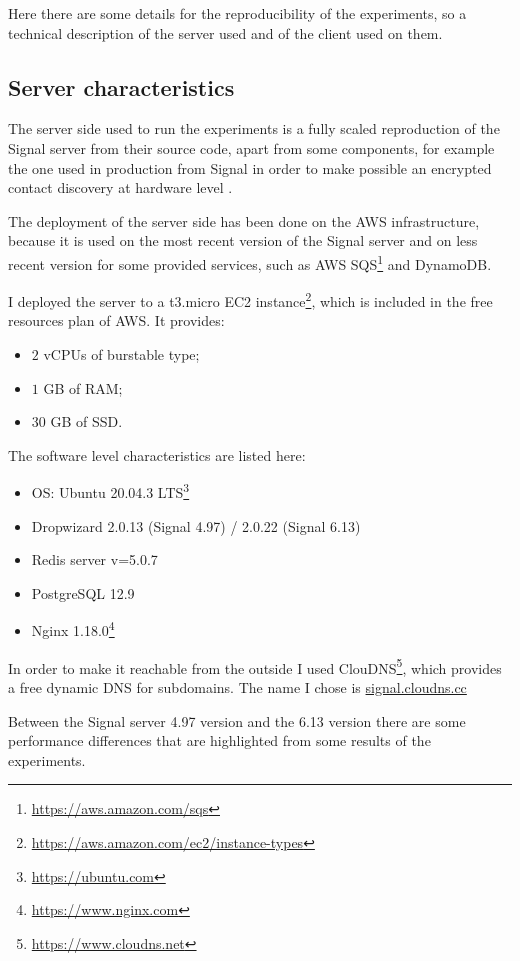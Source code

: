 Here there are some details for the reproducibility of the experiments, so a technical description of the server used and of the client used on them.

\subsection{Server characteristics\label{sec:servercharacteristics}}

The server side used to run the experiments is a fully scaled reproduction of the Signal server from their source code, apart from some components, for example the one used in production from Signal in order to make possible an encrypted contact discovery at hardware level \parencite{signal_cds}.

The deployment of the server side has been done on the AWS infrastructure, because it is used on the most recent version of the Signal server and on less recent version for some provided services, such as AWS SQS\footnote{\url{https://aws.amazon.com/sqs}} and DynamoDB.

I deployed the server to a t3.micro EC2 instance\footnote{\url{https://aws.amazon.com/ec2/instance-types}}, which is included in the free resources plan of AWS.
It provides:
\begin{itemize}
    \item $2$ vCPUs of burstable type;
    \item $1$ GB of RAM;
    \item $30$ GB of SSD.
\end{itemize}

The software level characteristics are listed here:
\begin{itemize}
    \item OS: Ubuntu 20.04.3 LTS\footnote{\url{https://ubuntu.com}}
    \item Dropwizard 2.0.13 (Signal 4.97) / 2.0.22 (Signal 6.13)
    \item Redis server v=5.0.7
    \item PostgreSQL 12.9
    \item Nginx 1.18.0\footnote{\url{https://www.nginx.com}}
\end{itemize}

In order to make it reachable from the outside I used ClouDNS\footnote{\url{https://www.cloudns.net}}, which provides a free dynamic DNS for subdomains. The name I chose is \url{signal.cloudns.cc}

Between the Signal server 4.97 version and the 6.13 version there are some performance differences that are highlighted from some results of the experiments.

